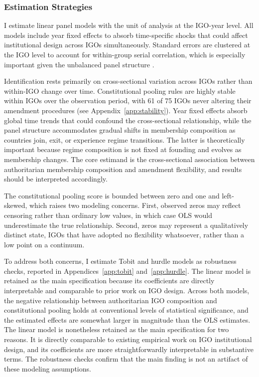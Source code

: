\documentclass[12pt]{article}
\begin{document}
\subsubsection{Estimation Strategies}

I estimate linear panel models with the unit of analysis at the IGO-year level. All models include year fixed effects to absorb time-specific shocks that could affect institutional design across IGOs simultaneously. Standard errors are clustered at the IGO level to account for within-group serial correlation, which is especially important given the unbalanced panel structure \parencite{pustejovsky_clubsandwich_2017}.


Identification rests primarily on cross-sectional variation across IGOs rather than within-IGO change over time. Constitutional pooling rules are highly stable within IGOs over the observation period, with 61 of 75 IGOs never altering their amendment procedures (see Appendix~\ref{app:stability}). Year fixed effects absorb global time trends that could confound the cross-sectional relationship, while the panel structure accommodates gradual shifts in membership composition as countries join, exit, or experience regime transitions. The latter is theoretically important because regime composition is not fixed at founding and evolves as membership changes. The core estimand is the cross-sectional association between authoritarian membership composition and amendment flexibility, and results should be interpreted accordingly.



The constitutional pooling score is bounded between zero and one and left-skewed, which raises two modeling concerns. First, observed zeros may reflect censoring rather than ordinary low values, in which case OLS would underestimate the true relationship. Second, zeros may represent a qualitatively distinct state, IGOs that have adopted no flexibility whatsoever, rather than a low point on a continuum. 

To address both concerns, I estimate Tobit and hurdle models as robustness checks, reported in Appendices~\ref{app:tobit} and~\ref{app:hurdle}. The linear model is retained as the main specification because its coefficients are directly interpretable and comparable to prior work on IGO design. Across both models, the negative relationship between authoritarian IGO composition and constitutional pooling holds at conventional levels of statistical significance, and the estimated effects are somewhat larger in magnitude than the OLS estimates. The linear model is nonetheless retained as the main specification for two reasons. It is directly comparable to existing empirical work on IGO institutional design, and its coefficients are more straightforwardly interpretable in substantive terms. The robustness checks confirm that the main finding is not an artifact of these modeling assumptions.
\end{document}

